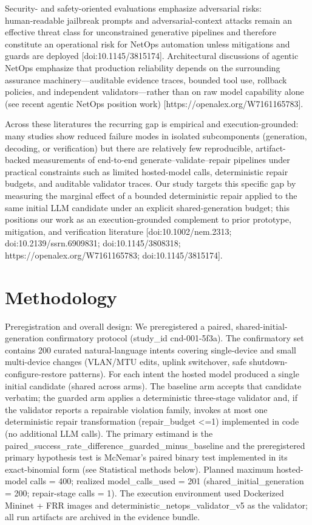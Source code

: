 \documentclass[conference]{IEEEtran}
\begin{document}
Security- and safety-oriented evaluations emphasize adversarial risks: human‑readable jailbreak prompts and adversarial-context attacks remain an effective threat class for unconstrained generative pipelines and therefore constitute an operational risk for NetOps automation unless mitigations and guards are deployed [doi:10.1145/3815174]. Architectural discussions of agentic NetOps emphasize that production reliability depends on the surrounding assurance machinery---auditable evidence traces, bounded tool use, rollback policies, and independent validators---rather than on raw model capability alone (see recent agentic NetOps position work) [https://openalex.org/W7161165783].

Across these literatures the recurring gap is empirical and execution-grounded: many studies show reduced failure modes in isolated subcomponents (generation, decoding, or verification) but there are relatively few reproducible, artifact-backed measurements of end-to-end generate--validate--repair pipelines under practical constraints such as limited hosted-model calls, deterministic repair budgets, and auditable validator traces. Our study targets this specific gap by measuring the marginal effect of a bounded deterministic repair applied to the same initial LLM candidate under an explicit shared-generation budget; this positions our work as an execution-grounded complement to prior prototype, mitigation, and verification literature [doi:10.1002/nem.2313; doi:10.2139/ssrn.6909831; doi:10.1145/3808318; https://openalex.org/W7161165783; doi:10.1145/3815174].

\section{Methodology}
Preregistration and overall design: We preregistered a paired, shared-initial-generation confirmatory protocol (study\_id cnd-001-5f3a). The confirmatory set contains 200 curated natural-language intents covering single-device and small multi-device changes (VLAN/MTU edits, uplink switchover, safe shutdown-configure-restore patterns). For each intent the hosted model produced a single initial candidate (shared across arms). The baseline arm accepts that candidate verbatim; the guarded arm applies a deterministic three-stage validator and, if the validator reports a repairable violation family, invokes at most one deterministic repair transformation (repair\_budget <=1) implemented in code (no additional LLM calls). The primary estimand is the paired\_success\_rate\_difference\_guarded\_minus\_baseline and the preregistered primary hypothesis test is McNemar's paired binary test implemented in its exact-binomial form (see Statistical methods below). Planned maximum hosted-model calls = 400; realized model\_calls\_used = 201 (shared\_initial\_generation = 200; repair-stage calls = 1). The execution environment used Dockerized Mininet + FRR images and deterministic\_netops\_validator\_v5 as the validator; all run artifacts are archived in the evidence bundle.
\end{document}
